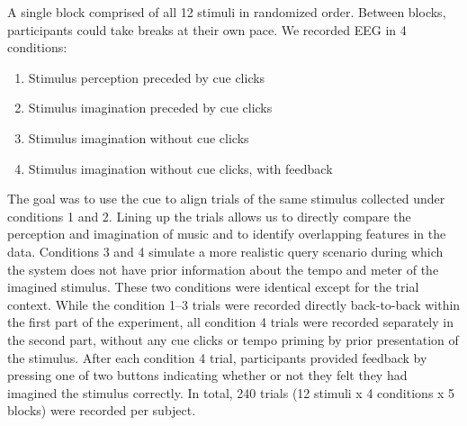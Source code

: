 A single block comprised of all 12 stimuli in randomized order.
Between blocks, participants could take breaks at their own pace.
We recorded EEG in 4 conditions:
\begin{enumerate}
\item
Stimulus perception preceded by cue clicks
\item
Stimulus imagination preceded by cue clicks
\item
Stimulus imagination without cue clicks
\item
Stimulus imagination without cue clicks, with feedback
\end{enumerate}
The goal was to use the cue to align trials of the same stimulus collected under conditions 1 and 2. Lining up the trials allows us to directly compare the perception and imagination of music and to identify overlapping features in the data. 
Conditions 3 and 4 simulate a more realistic query scenario during which the system does not have prior information about the tempo and meter of the imagined stimulus.
These two conditions were identical except for the trial context.
While the condition 1--3 trials were recorded directly back-to-back within the first part of the experiment, 
all condition 4 trials were recorded separately in the second part, without any cue clicks or tempo priming by prior presentation of the stimulus.
After each condition 4 trial, participants provided feedback by pressing one of two buttons indicating whether or not they felt they had imagined the stimulus correctly.
In total, 240 trials (12 stimuli x 4 conditions x 5 blocks) were recorded per subject.
%



